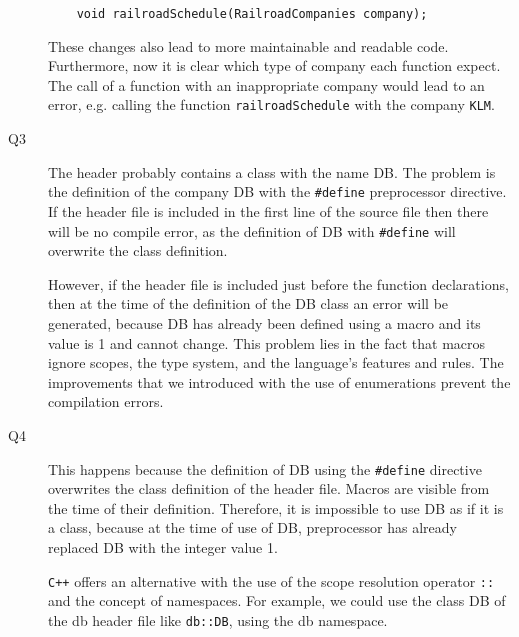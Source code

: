 \documentclass[a4paper]{article}
\newcounter{exerciseCount}
\newcommand{\exercise}[1]{\addtocounter{exerciseCount}{1} \noindent \medskip {\large \textsf{\textbf{Exercise \arabic{exerciseCount} #1}}} \par}
\begin{document}
\begin{description}
\begin{verbatim}
	void railroadSchedule(RailroadCompanies company);
	\end{verbatim}
	
	These changes also lead to more maintainable and readable code. Furthermore, now it is clear which type of company each function expect. The call of a function with an inappropriate company would lead to an error, e.g. calling the function \verb|railroadSchedule| with the company \verb|KLM|.
	\item[Q3]\-
	The header probably contains a class with the name DB. The problem is the definition of the company DB with the \verb|#define| preprocessor directive. If the header file is included in the first line of the source file then there will be no compile error, as the definition of DB with \verb|#define| will overwrite the class definition.
	
	However, if the header file is included just before the function declarations, then at the time of the definition of the DB class an error will be generated, because DB has already been defined using a macro and its value is 1 and cannot change. This problem lies in the fact that macros ignore scopes, the type system, and the language's features and rules. The improvements that we introduced with the use of enumerations prevent the compilation errors.
	\item[Q4]\-
	This happens because the definition of DB using the \verb|#define| directive overwrites the class definition of the header file. Macros are visible from the time of their definition. Therefore, it is impossible to use DB as if it is a class, because at the time of use of DB, preprocessor has already replaced DB with the integer value 1.
	
	\verb|C++| offers an alternative with the use of the scope resolution operator \verb|::| and the concept of namespaces. For example, we could use the class DB of the db header file like \verb|db::DB|, using the db namespace.
\end{description}

\exercise{}
\end{document}
